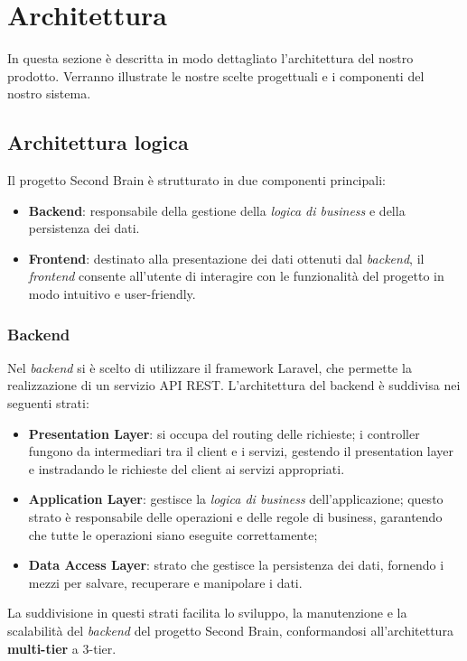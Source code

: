 \documentclass[a4paper,10pt]{article}
\begin{document}
\newpage

\section{Architettura}
In questa sezione è descritta in modo dettagliato l'architettura del nostro prodotto. Verranno illustrate le nostre scelte progettuali e i componenti del nostro sistema.

\subsection{Architettura logica}
Il progetto Second Brain è strutturato in due componenti principali:
\begin{itemize}
    \item \textbf{Backend}: responsabile della gestione della \textit{logica di business} e della persistenza dei dati.
    \item \textbf{Frontend}: destinato alla presentazione dei dati ottenuti dal \textit{backend}, il \textit{frontend} consente all'utente di interagire con le funzionalità del progetto in modo intuitivo e user-friendly.
\end{itemize}
\subsubsection{Backend}
Nel \textit{backend} si è scelto di utilizzare il framework Laravel, che permette la realizzazione di un servizio API REST. L'architettura del backend è suddivisa nei seguenti strati: 
\begin{itemize}
    \item \textbf{Presentation Layer}: si occupa del routing delle richieste; i controller fungono da intermediari tra il client e i servizi, gestendo il presentation layer e instradando le richieste del client ai servizi appropriati.
    \item \textbf{Application Layer}: gestisce la \textit{logica di business} dell'applicazione; questo strato è responsabile delle operazioni e delle regole di business, garantendo che tutte le operazioni siano eseguite correttamente;
    \item \textbf{Data Access Layer}: strato che gestisce la persistenza dei dati, fornendo i mezzi per salvare, recuperare e manipolare i dati.
\end{itemize}
La suddivisione in questi strati facilita lo sviluppo, la manutenzione e la scalabilità del \textit{backend} del progetto Second Brain, conformandosi all'architettura \textbf{multi-tier} a 3-tier. 
\end{document}

